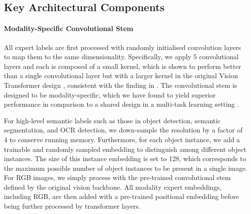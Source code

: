 \documentclass[11pt]{article}
\begin{document}
{\subsection{Key Architectural Components}
\label{sec:arch}

\paragraph{Modality-Specific Convolutional Stem}  All expert labels are first processed with randomly initialised convolution layers to map them to the same dimensionality. Specifically, we apply 5 convolutional layers and each is composed of a small  kernel, which is shown to perform better than a single convolutional layer but with a larger kernel in the original Vision Transformer design \cite{dosovitskiy2020vit}, consistent with the finding in \cite{xiao2021early}. The convolutional stem is designed to be modality-specific, which we have found to yield superior performance in comparison to a shared design in a multi-task learning setting \cite{shikun2019mtan,misra2016cross_stitch}. 

For high-level semantic labels such as those in object detection, semantic segmentation, and OCR detection, we down-sample the resolution by a factor of 4 to conserve running memory. Furthermore, for each object instance, we add a trainable and randomly sampled embedding to distinguish among different object instances. The size of this instance embedding is set to 128, which corresponds to the maximum possible number of object instances to be present in a single image. For RGB images, we simply process with the pre-trained convolutional stem defined by the original vision backbone. All modality expert embeddings, including RGB, are then added with a pre-trained positional embedding before being further processed by transformer layers.


}
\end{document}
